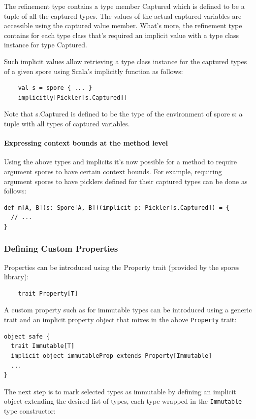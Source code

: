 \documentclass{llncs}
\begin{document}
The refinement type contains a type member Captured which is defined to be a tuple of all the captured types. The values of the actual captured variables are accessible using the captured value member. What's more, the refinement type contains for each type class that's required an implicit value with a type class instance for type Captured.

Such implicit values allow retrieving a type class instance for the captured types of a given spore using Scala's implicitly function as follows:

\begin{lstlisting}
    val s = spore { ... }
    implicitly[Pickler[s.Captured]]
\end{lstlisting}

Note that s.Captured is defined to be the type of the environment of spore s: a tuple with all types of captured variables.

\paragraph{Expressing context bounds at the method level}

Using the above types and implicits it's now possible for a method to require argument spores to have certain context bounds. For example, requiring argument spores to have picklers defined for their captured types can be done as follows:

\begin{lstlisting}
def m[A, B](s: Spore[A, B])(implicit p: Pickler[s.Captured]) = {
  // ...
}
\end{lstlisting}


\subsubsection{Defining Custom Properties}

Properties can be introduced using the Property trait (provided by the spores library):

\begin{lstlisting}
    trait Property[T]
\end{lstlisting}

A custom property such as for immutable types can be introduced using a generic trait and an implicit property object that mixes in the above \verb|Property| trait:

\begin{lstlisting}
object safe {
  trait Immutable[T]
  implicit object immutableProp extends Property[Immutable]
  ...
}
\end{lstlisting}
\noindent
The next step is to mark selected types as immutable by defining an implicit object extending the desired list of types, each type wrapped in the \verb|Immutable| type constructor:
\end{document}
